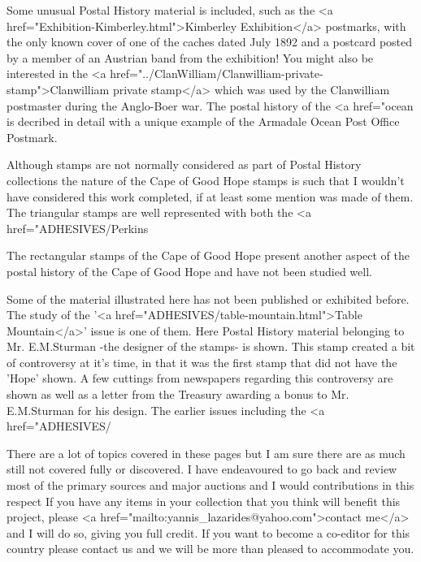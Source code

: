 Some unusual Postal History material is included, 
such as the <a href="Exhibition-Kimberley.html">Kimberley Exhibition</a>
postmarks, with the only known cover of one of the 
caches dated July 1892 and a postcard posted by a member of an 
Austrian band from the exhibition! You might also be interested in the 
<a href="../ClanWilliam/Clanwilliam-private-stamp">Clanwilliam private stamp</a> 
which was used by the Clanwilliam postmaster during the Anglo-Boer war. 
The postal history of the <a href="ocean%
is decribed in detail with a unique example of the Armadale Ocean Post Office Postmark.
            
            
Although stamps are not normally considered as part of Postal History collections the nature of the Cape of Good Hope stamps is such that I wouldn't have considered this work completed, if at least some mention was made of them. The triangular stamps are well represented with both the <a href="ADHESIVES/Perkins%

The rectangular stamps of the Cape of Good Hope present another aspect of the postal history of the Cape of Good Hope and have not been studied well. 
            
Some of the material illustrated here has not been published or exhibited before. The study of the '<a href="ADHESIVES/table-mountain.html">Table Mountain</a>' issue is one of them. Here Postal History material belonging to Mr. E.M.Sturman -the designer of the stamps- is shown. This stamp created a bit of controversy at it's time, in that it was the first stamp that did not have the 'Hope' shown. A few cuttings from newspapers regarding this controversy are shown as well as a letter from the Treasury awarding a bonus to Mr. E.M.Sturman for his design. The earlier issues including the <a href="ADHESIVES/%

There are  a lot of topics covered in these pages but I am sure there are as much 
still not covered fully or discovered. I have endeavoured to go back and review most of the primary sources and major auctions and I would contributions in this respect
If you have any items in your collection that you think will 
benefit this project, please <a href="mailto:yannis_lazarides@yahoo.com">contact me</a> 
and I will do so, giving you full credit. If you want to become a co-editor for this country please contact us and we will be more than pleased to accommodate you.
           
          
                          